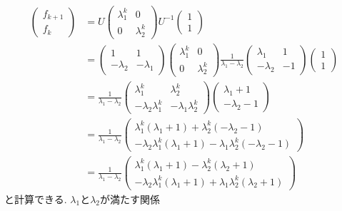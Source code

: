 \documentclass[a4paper,12pt]{jarticle}
\begin{document}
\begin{align*} \begin{pmatrix} f_{k+1} \\ f_k \end{pmatrix}
&= U \begin{pmatrix} \lambda_1^k & 0 \\ 0 & \lambda_2^k \end{pmatrix} U^{-1}  \begin{pmatrix} 1 \\ 1 \end{pmatrix} \\
&= \left( \begin{array} {cc} 1 & 1 \\ -\lambda_2 & -\lambda_1 \end{array} \right)
\begin{pmatrix} \lambda_1^k & 0 \\ 0 & \lambda_2^k \end{pmatrix}
\frac{1}{\lambda_1 - \lambda_2} \left( \begin{array} {cc} \lambda_1 & 1 \\ -\lambda_2 & -1 \end{array} \right)
\begin{pmatrix} 1 \\ 1 \end{pmatrix} \\
&= \frac{1}{\lambda_1 - \lambda_2} \begin{pmatrix} \lambda_1^k & \lambda_2^k \\ -\lambda_2 \lambda_1^k & -\lambda_1 \lambda_2^k \end{pmatrix}
\begin{pmatrix} \lambda_1 + 1 \\ -\lambda_2 - 1 \end{pmatrix} \\
&=  \frac{1}{\lambda_1 - \lambda_2} 
\begin{pmatrix} \lambda_1^k (\lambda_1 + 1) + \lambda_2^k ( -\lambda_2 - 1) \\ 
-\lambda_2\lambda_1^k (\lambda_1 + 1) - \lambda_1\lambda_2^k ( -\lambda_2 - 1) \end{pmatrix} \\
&=  \frac{1}{\lambda_1 - \lambda_2} \begin{pmatrix} \lambda_1^k ( \lambda_1 + 1) - \lambda_2^k ( \lambda_2 + 1) \\ 
-\lambda_2 \lambda_1^k (\lambda_1 + 1) + \lambda_1 \lambda_2^k (\lambda_2 + 1) \end{pmatrix} 
\end{align*}
と計算できる. $\lambda_1$と$\lambda_2$が満たす関係
\end{document}
